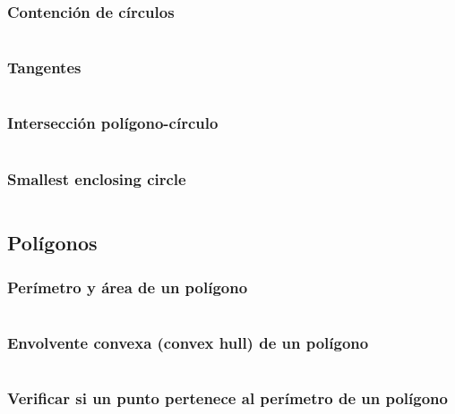 \documentclass[11pt]{article}
\begin{document}
			\subsubsection{Contención de círculos}
			\inputminted[tabsize=2,breaklines,firstline=450,lastline=469,fontsize=\small]{c++}{geometry.cpp}
			
			\subsubsection{Tangentes}
			\inputminted[tabsize=2,breaklines,firstline=471,lastline=501,fontsize=\small]{c++}{geometry.cpp}
			
			\subsubsection{Intersección polígono-círculo}
			\inputminted[tabsize=2,breaklines,firstline=797,lastline=832,fontsize=\small]{c++}{geometry.cpp}
			
			\subsubsection{Smallest enclosing circle}
			\inputminted[tabsize=2,breaklines,firstline=756,lastline=787,fontsize=\small]{c++}{geometry.cpp}
		
		\subsection{Polígonos}
			\subsubsection{Perímetro y área de un polígono}
			\inputminted[tabsize=2,breaklines,firstline=174,lastline=190,fontsize=\small]{c++}{geometry.cpp}
			
			\subsubsection{Envolvente convexa (convex hull) de un polígono}
			\inputminted[tabsize=2,breaklines,firstline=192,lastline=211,fontsize=\small]{c++}{geometry.cpp}
			
			\subsubsection{Verificar si un punto pertenece al perímetro de un polígono}
			\inputminted[tabsize=2,breaklines,firstline=213,lastline=221,fontsize=\small]{c++}{geometry.cpp}
			
\end{document}
